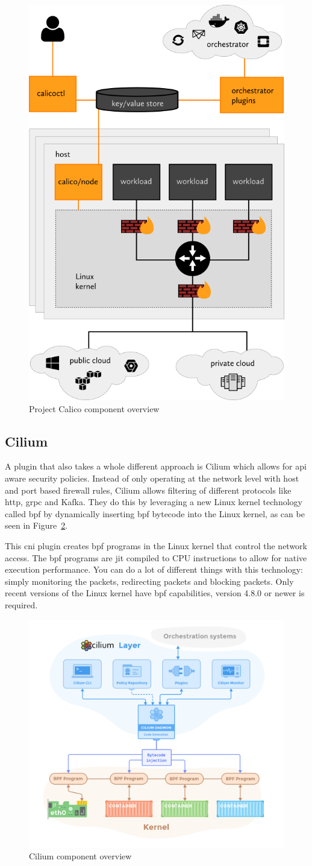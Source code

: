 \begin{figure}
    \centering
    \includegraphics[width=0.4\columnwidth]{images/calico-arch}
    \caption{Project Calico component overview \cite{calico_about}}
    \label{fig:calico-arc}
\end{figure}

\subsection{Cilium}
\label{subsec:cilium}
A plugin that also takes a whole different approach is Cilium\cite{cilium} which allows for \gls{api} aware security policies. Instead of only operating at the network level with host and port based firewall rules, Cilium allows filtering of different protocols like \gls{http}, \gls{grpc}\cite{grpc} and Kafka\cite{kafka}. They do this by leveraging a new Linux kernel technology called \gls{bpf}\cite{mccanne1993bsd, cilium_bpf} by dynamically inserting \gls{bpf} bytecode into the Linux kernel, as can be seen in Figure~\ref{fig:cilium-arch}. 

This \gls{cni} plugin creates \gls{bpf} programs in the Linux kernel that control the network access. The \gls{bpf} programs are \gls{jit} compiled to CPU instructions to allow for native execution performance. You can do a lot of different things with this technology: simply monitoring the packets, redirecting packets and blocking packets. Only recent versions of the Linux kernel have \gls{bpf} capabilities, version 4.8.0 or newer is required. 

\begin{figure}
    \centering
    \includegraphics[width=0.7\columnwidth]{images/cilium-arch}
    \caption{Cilium component overview \cite{cilium_concepts}}
    \label{fig:cilium-arch}
\end{figure}
